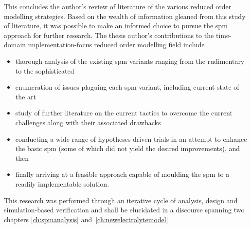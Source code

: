 This concludes  the author's review of  literature of the various  reduced order
modelling strategies. Based on the wealth of information gleaned from this study
of  literature,  it was  possible  to  make an  informed  choice  to pursue  the
\gls{spm} approach  for further research.  The thesis author's  contributions to
the time-domain implementation-focus reduced order modelling field include
\begin{itemize}[noitemsep,topsep=0pt, before={\vspace*{-0.25\baselineskip}}]
    \item thorough analysis of the existing \gls{spm} variants ranging from the rudimentary to the sophisticated
    \item enumeration of issues plaguing each \gls{spm} variant, including current state of the art
    \item study of further literature on the current tactics to overcome the current challenges along with their associated drawbacks
    \item conducting a  wide range of hypotheses-driven trials in an attempt to enhance  the basic \gls{spm} (some of which did not yield the desired
        improvements), and then
    \item finally arriving at  a  feasible  approach  capable  of  moulding  the  \gls{spm}  to  a  readily implementable  solution.
\end{itemize}
This research was  performed through an iterative cycle of  analysis, design and
simulation-based verification  and shall be  elucidated in a  discourse spanning
two chapters \viz{} \cref{ch:spmanalysis} and~\cref{ch:newelectrolytemodel}.


